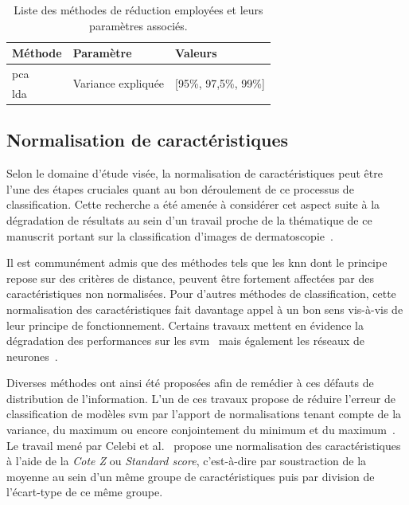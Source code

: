 \begin{table}[H]
    \centering
    \begin{tabular}{lll}
        \toprule
        \textbf{Méthode}       & \textbf{Paramètre}                 & \textbf{Valeurs}                      \\ \midrule
        \gls{pca}              & \multirow{2}{*}{Variance expliquée}& \multirow{2}{*}{[95\%, 97,5\%, 99\%]} \\ \cline{1-1}
        \gls{lda}              &                                    &                                       \\ 
        \bottomrule
    \end{tabular}
    \caption{Liste des méthodes de réduction employées et leurs paramètres associés.}
    \label{tab:summary_reduction_methods}
\end{table}\par

\subsection{Normalisation de caractéristiques}
\label{subsec:features_normalisation}
Selon le domaine d'étude visée, la normalisation de caractéristiques peut être l'une des étapes cruciales quant au bon déroulement de ce processus de classification. Cette recherche a été amenée à considérer cet aspect suite à la dégradation de résultats au sein d'un travail proche de la thématique de ce manuscrit portant sur la classification d'images de dermatoscopie~\cite{Celebi2007}.\par

Il est communément admis que des méthodes tels que les \gls{knn} dont le principe repose sur des critères de distance, peuvent être fortement affectées par des caractéristiques non normalisées. Pour d'autres méthodes de classification, cette normalisation des caractéristiques fait davantage appel à un bon sens vis-à-vis de leur principe de fonctionnement. Certains travaux mettent en évidence la dégradation des performances sur les \gls{svm}~\cite{Juszczak2002} mais également les réseaux de neurones~\cite{Celebi2007}.\par

Diverses méthodes ont ainsi été proposées afin de remédier à ces défauts de distribution de l'information. L'un de ces travaux propose de réduire l'erreur de classification de modèles \gls{svm} par l'apport de normalisations tenant compte de la variance, du maximum ou encore conjointement du minimum et du maximum~\cite{Juszczak2002}. Le travail mené par Celebi et al.~\cite{Celebi2007} propose une normalisation des caractéristiques à l'aide de la \textit{Cote Z} ou \textit{Standard score}, c’est-à-dire par soustraction de la moyenne au sein d'un même groupe de caractéristiques puis par division de l'écart-type de ce même groupe.\par

